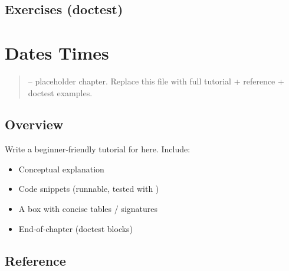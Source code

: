 \documentclass[a4paper,11pt,english]{sphinxmanual}
\begin{document}
\subsection{Exercises (doctest)}
\label{\detokenize{stdlib/concurrency_primitives:exercises-doctest}}
\begin{sphinxVerbatim}[commandchars=\\\{\}]
\end{sphinxVerbatim}

\sphinxstepscope


\section{Dates Times}
\label{\detokenize{stdlib/dates_times:dates-times}}\label{\detokenize{stdlib/dates_times::doc}}\begin{quote}

\sphinxAtStartPar
{} – placeholder chapter. Replace this file with full tutorial + reference + doctest examples.
\end{quote}


\subsection{Overview}
\label{\detokenize{stdlib/dates_times:overview}}
\sphinxAtStartPar
Write a beginner‑friendly tutorial for  here. Include:
\begin{itemize}
\item {} 
\sphinxAtStartPar
Conceptual explanation

\item {} 
\sphinxAtStartPar
Code snippets (runnable, tested with )

\item {} 
\sphinxAtStartPar
A  box with concise tables / signatures

\item {} 
\sphinxAtStartPar
End‑of‑chapter  (doctest blocks)

\end{itemize}


\subsection{Reference}
\label{\detokenize{stdlib/dates_times:reference}}
\end{document}
